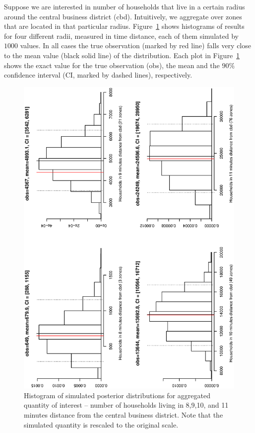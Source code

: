 \documentclass[11pt, fleqn]{article}
\begin{document}
Suppose we are interested in number of households that live in a certain
radius around the central business district (cbd). Intuitively, we aggregate
over zones that are located in that particular radius.
Figure~\ref{fig:aggr-cbd} shows histograms of results for four different
radii, measured in time distance, each of them simulated by $1000$ values. In
all cases the true observation (marked by red line) falls very close to the
mean value (black solid line) of the distribution. Each plot in
Figure~\ref{fig:aggr-cbd} shows the exact value for the true observation
(obs), the mean and the $90\%$ confidence interval (CI, marked by dashed
lines), respectively.

\begin{figure}[t]
\begin{center}
\includegraphics[scale=0.5, angle=-90]{pic/aggr.cbd.hu.ps}
\caption{\label{fig:aggr-cbd}\small Histogram of simulated posterior
  distributions for aggregated quantity of interest -- number of households
  living in 8,9,10, and 11 minutes distance from the central business
  district. Note that the simulated quantity is rescaled to the original
  scale.}
\end{center}
\end{figure}
\end{document}
